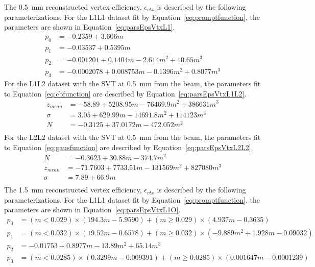 The 0.5~mm reconstructed vertex efficiency, $\epsilon_{vtx}$ is described by the following parameterizations. For the L1L1 dataset fit by Equation~\eqref{eq:promptfunction}, the parameters are shown in Equation~\ref{eq:parsEpsVtxL1}.
\begin{equation}
\begin{split}
\label{eq:parsEpsVtxL1}
p_0 &= -0.2359+3.606m\\
p_1 &= -0.03537+0.5395m \\
p_2 &= -0.001201+0.1404m-2.614m^2+10.65m^3 \\
p_3 &= -0.0002078+0.008753m-0.1396m^2+0.8077m^3
\end{split}
\end{equation}
For the L1L2 dataset with the SVT at 0.5~mm from the beam, the parameters fit to Equation~\eqref{eq:cbfunction} are described by Equation~\eqref{eq:parsEpsVtxL1L2}.
\begin{equation}
\begin{split}
\label{eq:parsEpsVtxL1L2}
z_{mean} &= -58.89+5208.95m-76469.9m^2+386631m^3\\
\sigma &= 3.05+629.99m-14691.8m^2+114123m^3\\
N &= -0.3125+37.0172m-472.052m^2 \\
\end{split}
\end{equation}
For the L2L2 dataset with the SVT at 0.5~mm from the beam, the parameters fit to Equation~\eqref{eq:gausfunction} are described by Equation~\eqref{eq:parsEpsVtxL2L2}.
\begin{equation}
\begin{split}
\label{eq:parsEpsVtxL2L2}
N &= -0.3623+30.88m-374.7m^2\\
z_{mean} &= -71.7603+7733.51m-131569m^2+827080m^3\\
\sigma &= 7.89+66.9m\\
\end{split}
\end{equation}
\indent The 1.5~mm reconstructed vertex efficiency, $\epsilon_{vtx}$ is described by the following parameterizations. For the L1L1 dataset fit by Equation~\eqref{eq:promptfunction}, the parameters are shown in Equation~\ref{eq:parsEpsVtxL1O}.
\begin{equation}
\begin{split}
\label{eq:parsEpsVtxL1O}
p_0 &= (m<0.029)\times(194.3m-5.9590)+(m\geq 0.029)\times(4.937m-0.3635)\\
p_1 &= (m<0.032)\times(19.52m-0.6578)+(m\geq 0.032)\times(-9.889m^2+1.928m-0.09032)\\
p_2 &= -0.01753+0.8977m-13.89m^2+65.14m^3 \\
p_3 &= (m<0.0285)\times(0.3299m-0.009391)+(m\geq 0.0285)\times(0.001647m-0.0001239)\\
\end{split}
\end{equation}
